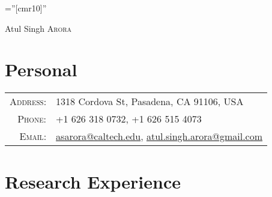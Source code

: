 \documentclass[a4paper,10pt]{article}
\begin{document}

\pagestyle{empty} %

\font\fb=''[cmr10]'' %

		{\Huge Atul Singh \textsc{Arora}}    

\section{Personal}

\begin{tabular}{rl}
    \textsc{Address:}   & 1318 Cordova St, Pasadena, CA 91106, USA \\
    \textsc{Phone:}     & +1 626 318 0732,
                        +1 626 515 4073\\
    \textsc{Email:}     & \href{mailto:asarora@caltech.edu}{asarora@caltech.edu}, \href{mailto:atul.singh.arora@gmail.com}{atul.singh.arora@gmail.com}%
\end{tabular}


\section{Research Experience}
\end{document}
